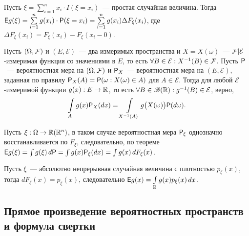 Пусть $\xi = \sum\limits_{i = 1}^n x_i \cdot I (\xi = x_i)$~--- простая случайная величина. Тогда $\E g(\xi) = \sum\limits_{i=1}^{n} g(x_i) \cdot \P(\xi = x_i) = \sum\limits_{i = 1}^n g(x_i) \Delta F_\xi (x_i)$, где $\Delta F_\xi(x_i) = F_\xi(x_i) - F_\xi (x_i - 0)$.

\begin{theorem}
	Пусть $(\Omega, \F)$ и $(E, \mathcal{E})$~--- два измеримых пространства и $X = X(\omega)$~--- $\F | \mathcal{E}$-измеримая функция со значениями в $E$, то есть $\forall B \in \mathcal{E}: X^{-1}(B) \in \F$. Пусть $\P$~--- вероятностная мера на $(\Omega, \F)$ и $\P_X$~--- вероятностная мера на $(E, \mathcal{E})$, заданная по правилу $\P_X(A) = \P (\omega: X(\omega) \in A)$ для $A \in \mathcal{E}$. Тогда для любой $\mathcal{E}$-измеримой функции $g(x):E \rightarrow \R$, то есть $\forall B \in \B(\R): g^{-1}(B) \in \mathcal{E}$, верно, 
	$$\int\limits_A g(x) \P_X(dx) = \int\limits_{X^{-1}(A)} g\big( X(\omega) \big) \P(d \omega).$$
\end{theorem}

Пусть $\xi : \Omega \rightarrow \R (\R^n)$, в таком случае вероятностная мера $\P_\xi$ однозначно восстанавливается по $F_\xi$, следовательно, по теореме $\E g(\xi) = \int g(\xi) \, d\P = \int g(x) \P_\xi(dx) = \int g(x) \, d F_\xi (x)$.

Пусть  $\xi$~--- абсолютно непрерывная случайная величина с плотностью $p_\xi(x)$, тогда $d F_\xi (x) = p_\xi (x)$, следовательно $\E g(x) = \int\limits_{\R} g(x) p_\xi(x) \, d x$.

\subsection{Прямое произведение вероятностных пространств и формула свертки}

